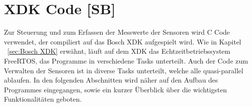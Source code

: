 
\chapter{XDK Code [SB]}\label{cha:XDK Code}
Zur Steuerung und zum Erfassen der Messwerte der Sensoren wird C Code verwendet, der compiliert auf das Bosch \acs{XDK} aufgespielt wird. Wie in Kapitel ~\ref{sec:Bosch XDK} erwähnt, läuft auf dem \acs{XDK} das Echtzeitbetriebssystem FreeRTOS, das Programme in verschiedene Tasks unterteilt. Auch der Code zum Verwalten der Sensoren ist in diverse Tasks unterteilt, welche alle quasi-parallel ablaufen.
\newline
In den folgenden Abschnitten wird näher auf den Aufbau des Programmes eingegangen, sowie ein kurzer Überblick über die wichtigsten Funktionalitäten geboten.
